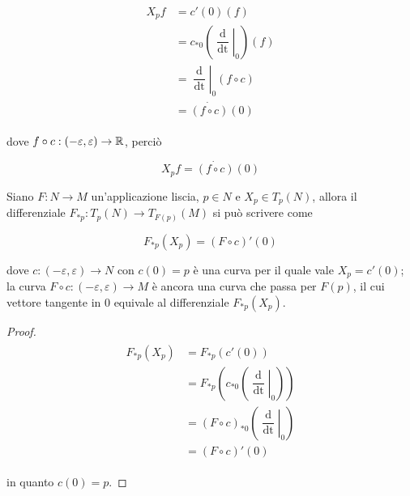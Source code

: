 \begin{align}
	\begin{split}
		X_{p} f &= c'(0) (f)\\
		&= c_{*0} \left( \left. \dfrac{\operatorname{d}}{\operatorname{dt}} \right|_{0} \right) (f)\\
		&= \left. \dfrac{\operatorname{d}}{\operatorname{dt}} \right|_{0} (f \circ c)\\
		&= \dot{(f \circ c)}(0)
	\end{split}
\end{align}

dove $ f \circ c : (-\varepsilon,\varepsilon) \to \mathbb{R} $, perciò

\begin{equation}
	X_{p} f = \dot{(f \circ c)}(0)
\end{equation}

\begin{definition}
	Siano $ F : N \to M $ un'applicazione liscia, $ p \in N $ e $ X_{p} \in T_{p}(N) $, allora il differenziale $ F_{*p} : T_{p}(N) \to T_{F(p)}(M) $ si può scrivere come
	
	\begin{equation}
		F_{*p}(X_{p}) = (F \circ c)' (0)
	\end{equation}

	dove $ c : (-\varepsilon,\varepsilon) \to N $ con $ c(0) = p $ è una curva per il quale vale $ X_{p} = c'(0) $; la curva $ F \circ c : (-\varepsilon,\varepsilon) \to M $ è ancora una curva che passa per $ F(p) $, il cui vettore tangente in 0 equivale al differenziale $ F_{*p}(X_{p}) $.
	
\end{definition}

\begin{proof}
	\begin{align}
		\begin{split}
			F_{*p}(X_{p}) &= F_{*p}(c'(0))\\
			&= F_{*p} \left( c_{*0} \left( \left. \dfrac{\operatorname{d}}{\operatorname{dt}} \right|_{0} \right) \right)\\
			&= (F \circ c)_{*0} \left( \left. \dfrac{\operatorname{d}}{\operatorname{dt}} \right|_{0} \right)\\
			&= (F \circ c)' (0)
		\end{split}
	\end{align}

	in quanto $ c(0)=p $.
\end{proof}

